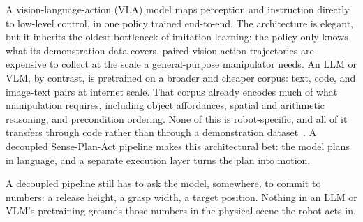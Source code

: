 A vision-language-action (VLA) model maps perception and instruction
directly to low-level control, in one policy trained end-to-end. The
architecture is elegant, but it inherits the oldest bottleneck of
imitation learning: the policy only knows what its demonstration data
covers.  paired vision-action trajectories are expensive
to collect at the scale a general-purpose manipulator needs. An LLM or
VLM, by contrast, is pretrained on a broader and cheaper corpus: text,
code, and image-text pairs at internet scale. That corpus already
encodes much of what manipulation requires, including object
affordances, spatial and arithmetic reasoning, and precondition
ordering. None of this is robot-specific, and all of it transfers
through code rather than through a demonstration
dataset~\cite{liang2023codeaspolicies, huang2023voxposer,
huang2022innermonologue, singh2023progprompt}. A decoupled
Sense-Plan-Act pipeline makes this architectural bet: the model plans
in language, and a separate execution layer turns the plan into
motion.

A decoupled pipeline still has to ask the model, somewhere, to commit
to numbers: a release height, a grasp width, a target position. Nothing
in an LLM or VLM's pretraining grounds those numbers in the physical
scene the robot acts in. 

